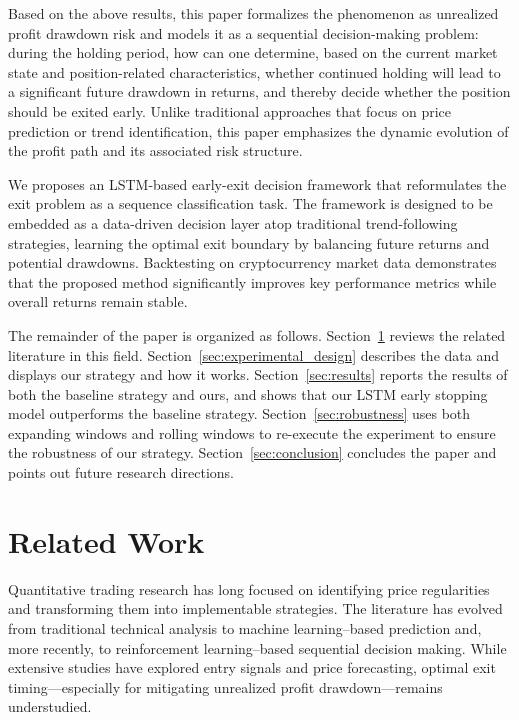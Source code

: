 \documentclass[12pt]{article}
\begin{document}
Based on the above results, this paper formalizes the phenomenon as unrealized profit drawdown risk and models it as a sequential decision-making problem: during the holding period, how can one determine, based on the current market state and position-related characteristics, whether continued holding will lead to a significant future drawdown in returns, and thereby decide whether the position should be exited early. Unlike traditional approaches that focus on price prediction or trend identification, this paper emphasizes the dynamic evolution of the profit path and its associated risk structure.

We proposes an LSTM-based early-exit decision framework that reformulates the exit problem as a sequence classification task. The framework is designed to be embedded as a data-driven decision layer atop traditional trend-following strategies, learning the optimal exit boundary by balancing future returns and potential drawdowns. Backtesting on cryptocurrency market data demonstrates that the proposed method significantly improves key performance metrics while overall returns remain stable.

The remainder of the paper is organized as follows. Section~\ref{sec:relatedWork} reviews the related literature in this field. Section~\ref{sec:experimental_design} describes the data and displays our strategy and how it works. Section~\ref{sec:results} reports the results of both the baseline strategy and ours, and shows that our LSTM early stopping model outperforms the baseline strategy. Section~\ref{sec:robustness} uses both expanding windows and rolling windows to re-execute the experiment to ensure the robustness of our strategy. Section~\ref{sec:conclusion} concludes the paper and points out future research directions.

\section{Related Work}\label{sec:relatedWork}

Quantitative trading research has long focused on identifying price regularities and transforming them into implementable strategies. The literature has evolved from traditional technical analysis to machine learning–based prediction and, more recently, to reinforcement learning–based sequential decision making. While extensive studies have explored entry signals and price forecasting, optimal exit timing—especially for mitigating unrealized profit drawdown—remains understudied.
\end{document}
